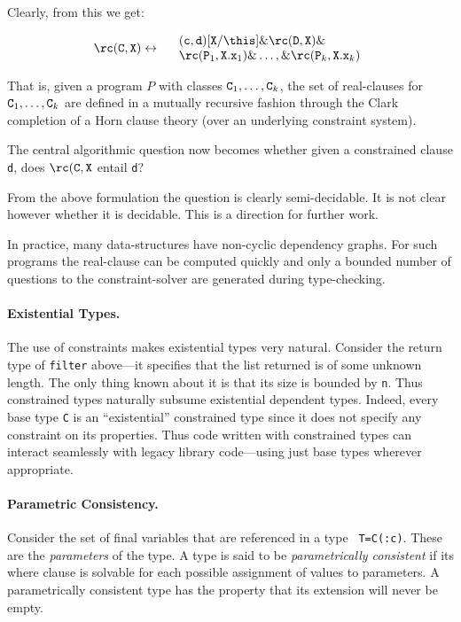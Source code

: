 \noindent Clearly, from this we get:

$$\rc({\tt C},{\tt X}) \leftrightarrow 
\begin{array}{l}
\quad ({\tt c},{\tt d})[{\tt X}/\this] \&   \rc({\tt D},{\tt X}) \& \\
\quad \rc({\tt P}_1, {\tt X.x}_1)\& \ldots, \& \rc({\tt P}_k, {\tt X.x}_k)
\end{array}
$$
  
That is, given a program $P$ with classes ${\tt C}_1,\ldots, {\tt
C}_k$, the set of real-clauses for ${\tt C}_1,\ldots, {\tt C}_k$ are
defined in a mutually recursive fashion through the Clark completion
of a Horn clause theory (over an underlying constraint system).

The central algorithmic question now becomes whether given a
constrained clause {\tt d}, does $\rc({\tt C},{\tt X}$ entail {\tt d}? 

From the above formulation the question is clearly semi-decidable. It
is not clear however whether it is decidable. This is a direction for
further work.

In practice, many data-structures have non-cyclic dependency
graphs. For such programs the real-clause can be computed quickly and
only a bounded number of questions to the constraint-solver are
generated during type-checking.

\paragraph{Existential Types.}
The use of constraints makes existential types very natural.  Consider
the return type of {\tt filter} above---it specifies that the list
returned is of some unknown length. The only thing known about it is
that its size is bounded by {\tt n}. Thus constrained types naturally
subsume existential dependent types. Indeed, every base type {\tt C}
is an ``existential'' constrained type since it does not specify any
constraint on its properties. Thus code written with constrained types
can interact seamlessly with legacy library code---using just base
types wherever appropriate.

\paragraph{Parametric Consistency.}
Consider the set of final variables that are referenced in a type {\tt
T=C(:c)}. These are the {\em parameters} of the type. A type is said
to be {\em parametrically consistent} if its where clause is solvable
for each possible assignment of values to parameters.  A
parametrically consistent type has the property that its extension
will never be empty. 

